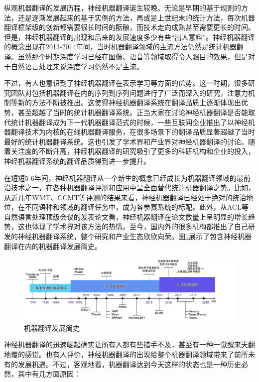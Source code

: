 \parinterval 纵观机器翻译的发展历程，神经机器翻译诞生较晚。无论是早期的基于规则的方法，还是逐渐发展起来的基于实例的方法，再或是上世纪末的统计方法，每次机器翻译框架级的创新都需要很长时间的酝酿，而技术走向成熟甚至需要更长的时间。但是，神经机器翻译的出现和后来的发展速度多少有些“出人意料”。神经机器翻译的概念出现在2013-2014年间，当时机器翻译领域的主流方法仍然是统计机器翻译。虽然那个时期深度学习已经在图像、语音等领域取得令人瞩目的效果，但是对于自然语言处理来说深度学习仍然不是主流。

\parinterval 不过，有人也意识到了神经机器翻译在表示学习等方面的优势。这一时期，很多研究团队对包括机器翻译在内的序列到序列问题进行了广泛而深入的研究，注意力机制等新的方法不断被推出。这使得神经机器翻译系统在翻译品质上逐渐体现出优势，甚至超越了当时的统计机器翻译系统。正当大家在讨论神经机器翻译是否能取代统计机器翻译成为下一代机器翻译范式的时候，一些互联网企业推出了以神经机器翻译技术为内核的在线机器翻译服务，在很多场景下的翻译品质显著超越了当时最好的统计机器翻译系统。这也引发了学术界和产业界对神经机器翻译的讨论。随着关注度的不断升高，神经机器翻译的研究吸引了更多的科研机构和企业的投入，神经机器翻译系统的翻译品质得到进一步提升。

\parinterval 在短短5-6年间，神经机器翻译从一个新生的概念已经成长为机器翻译领域的最前沿技术之一，在各种机器翻译评测和应用中呈全面替代统计机器翻译之势。比如，从近几年WMT、CCMT等评测的结果来看，神经机器翻译已经处于绝对的统治地位，在不同语种和领域的翻译任务中，成为各参赛系统的标配。此外，从ACL等自然语言处理顶级会议的发表论文看，神经机器翻译在论文数量上呈明显的增长趋势，这也体现了学术界对该方法的热情。至今，国内外的很多机构都推出了自己研发的神经机器翻译系统，整个研究和产业生态欣欣向荣。图\ref{fig:10-1}展示了包含神经机器翻译在内的机器翻译发展简史。

\begin{figure}[htp]
\centering
\includegraphics[scale=0.4]{./Chapter10/Figures/mt-history.png}
\caption{机器翻译发展简史}
\label{fig:10-1}
\end{figure}

\parinterval 神经机器翻译的迅速崛起确实让所有人都有些措手不及，甚至有一种一觉醒来天翻地覆的感觉。也有人评价，神经机器翻译的出现给整个机器翻译领域带来了前所未有的发展机遇。不过，客观地看，机器翻译达到今天这样的状态也是一种历史必然，其中有几方面原因：


